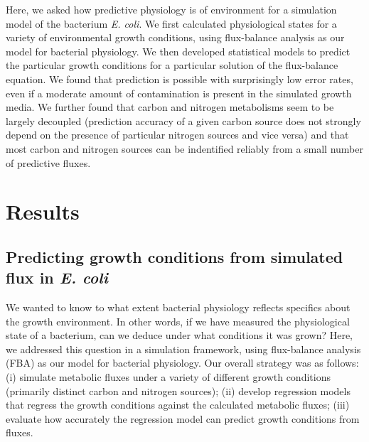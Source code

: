 \documentclass[12pt]{article}
\begin{document}
Here, we asked how predictive physiology is of environment for a simulation model of the bacterium \emph{E. coli}. We first calculated physiological states for a variety of environmental growth conditions, using flux-balance analysis as our model for bacterial physiology. We then developed statistical models to predict the particular growth conditions for a particular solution of the flux-balance equation. We found that prediction is possible with surprisingly low error rates, even if a moderate amount of contamination is present in the simulated growth media. We further found that carbon and nitrogen metabolisms seem to be largely decoupled (prediction accuracy of a given carbon source does not strongly depend on the presence of particular nitrogen sources and vice versa) and that most carbon and nitrogen sources can be indentified reliably from a small number of predictive fluxes.


\section*{Results}

\subsection*{Predicting growth conditions from simulated flux in \emph{E. coli}}

We wanted to know to what extent bacterial physiology reflects specifics about the growth environment. In other words, if we have measured the physiological state of a bacterium, can we deduce under what conditions it was grown? Here, we addressed this question in a simulation framework, using flux-balance analysis (FBA) as our model for bacterial physiology. Our overall strategy was as follows: (i) simulate metabolic fluxes under a variety of different growth conditions (primarily distinct carbon and nitrogen sources); (ii) develop regression models that regress the growth conditions against the calculated metabolic fluxes; (iii) evaluate how accurately the regression model can predict growth conditions from fluxes.
\end{document}
